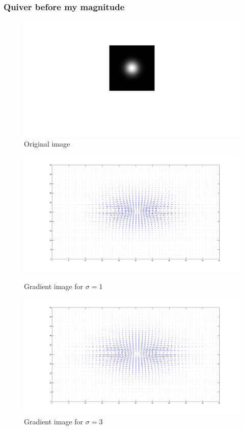 \documentclass[a4paper,10pt]{article}
\begin{document}
\subsubsection{Quiver before my magnitude}
\begin{figure}[ht]
\centering
\includegraphics[width=\textwidth]{quiver_original}
\caption{Original image}
\label{fig:quiver_original}
\end{figure}
\begin{figure}[ht]
\begin{minipage}[b]{0.45\linewidth}
\centering
\includegraphics[width=\textwidth]{quiver_sigma1}
\caption{Gradient image for $\sigma=1$}
\end{minipage}
\hspace{0.1cm}
\begin{minipage}[b]{0.45\linewidth}
\centering
\includegraphics[width=\textwidth]{quiver_sigma3}
\caption{Gradient image for $\sigma=3$}
\end{minipage}
\end{figure}
\end{document}

